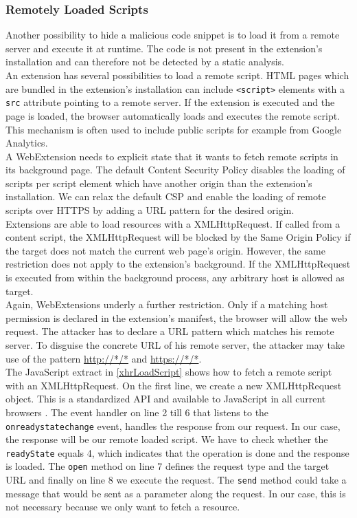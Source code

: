 \subsubsection{Remotely Loaded Scripts}

	Another possibility to hide a malicious code snippet is to load it from a remote server and execute it at runtime. The code is not present in the extension's installation and can therefore not be detected by a static analysis. \\
	
	An extension has several possibilities to load a remote script. HTML pages which are bundled in the extension's installation can include \texttt{<script>} elements with a \texttt{src} attribute pointing to a remote server. If the extension is executed and the page is loaded, the browser automatically loads and executes the remote script. This mechanism is often used to include public scripts for example from Google Analytics. \\
	A WebExtension needs to explicit state that it wants to fetch remote scripts in its background page. The default Content Security Policy disables the loading of scripts per script element which have another origin than the extension's installation. We can relax the default CSP and enable the loading of remote scripts over HTTPS by adding a URL pattern for the desired origin. \\
	
	Extensions are able to load resources with a XMLHttpRequest. If called from a content script, the XMLHttpRequest will be blocked by the Same Origin Policy if the target does not match the current web page's origin. However, the same restriction does not apply to the extension's background. If the XMLHttpRequest is executed from within the background process, any arbitrary host is allowed as target. \\
	Again, WebExtensions underly a further restriction. Only if a matching host permission is declared in the extension's manifest, the browser will allow the web request. The attacker has to declare a URL pattern which matches his remote server. To disguise the concrete URL of his remote server, the attacker may take use of the pattern \url{http://*/*} and \url{https://*/*}. \\
	The JavaScript extract in \autoref{xhrLoadScript} shows how to fetch a remote script with an XMLHttpRequest. On the first line, we create a new XMLHttpRequest object. This is a standardized API and available to JavaScript in all current browsers \cite{w3cXMLHttpRequest}. The event handler on line 2 till 6 that listens to the \texttt{onreadystatechange} event, handles the response from our request. In our case, the response will be our remote loaded script. We have to check whether the \texttt{readyState} equals 4, which indicates that the operation is done and the response is loaded. The \texttt{open} method on line 7 defines the request type and the target URL and finally on line 8 we execute the request. The \texttt{send} method could take a message that would be sent as a parameter along the request. In our case, this is not necessary because we only want to fetch a resource. 

